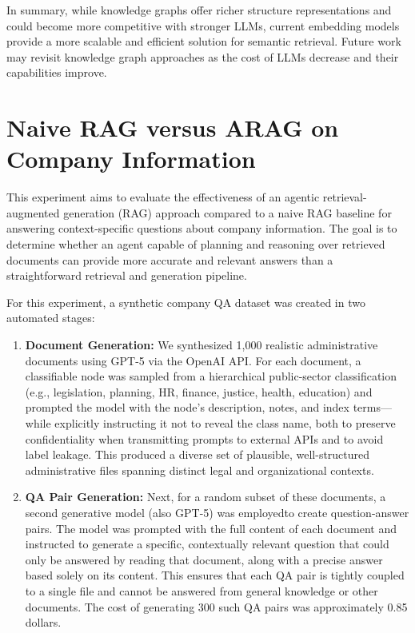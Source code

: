 In summary, while knowledge graphs offer richer structure representations and could become more competitive with stronger \glspl{LLM}, current embedding models provide a more scalable and efficient solution for semantic retrieval. Future work may revisit knowledge graph approaches as the cost of \glspl{LLM} decrease and their capabilities improve.

\section{Naive \gls{RAG} versus \gls{ARAG} on Company Information}
\label{sec:expNaiveVsAgenticRAG}
This experiment aims to evaluate the effectiveness of an agentic retrieval-augmented generation (\gls{RAG}) approach compared to a naive \gls{RAG} baseline for answering context-specific questions about company information. The goal is to determine whether an agent capable of planning and reasoning over retrieved documents can provide more accurate and relevant answers than a straightforward retrieval and generation pipeline.

For this experiment, a synthetic company QA dataset was created in two automated stages:
\begin{enumerate}
        \item \textbf{Document Generation:} We synthesized 1{,}000 realistic administrative documents using  \gls{GPT}-5 via the OpenAI API. For each document, a classifiable node was sampled from a hierarchical public-sector classification (e.g., legislation, planning, HR, finance, justice, health, education) and prompted the model with the node’s description, notes, and index terms—while explicitly instructing it not to reveal the class name, both to preserve confidentiality when transmitting prompts to external APIs and to avoid label leakage. This produced a diverse set of plausible, well-structured administrative files spanning distinct legal and organizational contexts.
        \item \textbf{QA Pair Generation:} \label{subsec:qa-generation} Next, for a random subset of these documents, a second generative model (also \gls{GPT}-5) was employedto create question-answer pairs. The model was prompted with the full content of each document and instructed to generate a specific, contextually relevant question that could only be answered by reading that document, along with a precise answer based solely on its content. This ensures that each QA pair is tightly coupled to a single file and cannot be answered from general knowledge or other documents. The cost of generating 300 such QA pairs was approximately 0.85 dollars.
\end{enumerate}

